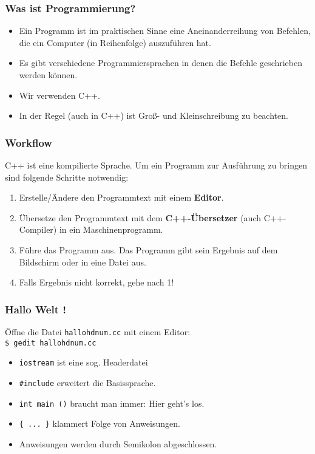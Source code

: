
\begin{frame}[fragile]
\frametitle{Was ist Programmierung?}
\begin{itemize}
\item Ein Programm ist im praktischen Sinne eine Aneinanderreihung von Befehlen,
die ein Computer (in Reihenfolge) auszuführen hat.
\item Es gibt verschiedene Programmiersprachen in denen die Befehle geschrieben werden können.
\item Wir verwenden C++.
\item In der Regel (auch in C++) ist Gro\ss - und Kleinschreibung zu beachten.
\end{itemize}
\end{frame}

\begin{frame}[fragile]
\frametitle{Workflow}
C++ ist eine \glqq{}kompilierte\grqq{} Sprache. Um ein Programm zur
Ausführung zu bringen sind folgende Schritte notwendig:
\begin{enumerate}
\item Erstelle/Ändere den Programmtext mit einem \textbf{Editor}.
\item Übersetze den Programmtext mit dem \textbf{C++-Übersetzer}
  (auch C++-Compiler) in ein Maschinenprogramm.
\item Führe das Programm aus. Das Programm gibt sein Ergebnis auf dem
  Bildschirm oder in eine Datei aus.
\item Falls Ergebnis nicht korrekt, gehe nach 1!
\end{enumerate}
\end{frame}


\begin{frame}[fragile]
\frametitle{Hallo Welt !}
Öffne die Datei \lstinline{hallohdnum.cc} mit einem Editor:
\\ \lstinline{$ gedit hallohdnum.cc} %

\begin{itemize}
\item \lstinline{iostream} ist eine sog. \glqq{}Headerdatei\grqq{}
\item \lstinline!#include! erweitert die \glqq{}Basissprache\grqq{}.
\item \lstinline!int main ()! braucht man immer: \glqq{}Hier geht's los\grqq{}.
\item \lstinline!{ ... }! klammert Folge von Anweisungen.
\item Anweisungen werden durch Semikolon abgeschlossen.
\end{itemize}
\end{frame}


